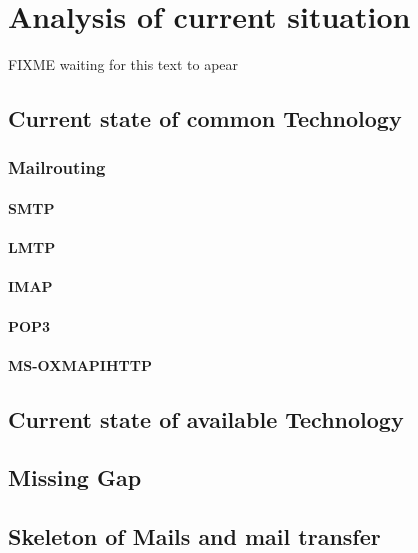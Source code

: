 \chapter{Analysis of current situation}\label{chap:analysis}
FIXME waiting for this text to apear
\section{Current state of common Technology}
\subsection{Mailrouting}
\subsubsection{SMTP}
\subsubsection{LMTP}
\subsubsection{IMAP}
\subsubsection{POP3}
\subsubsection{MS-OXMAPIHTTP}
\section{Current state of available Technology}
\section{Missing Gap}
\section{Skeleton of Mails and mail transfer}


